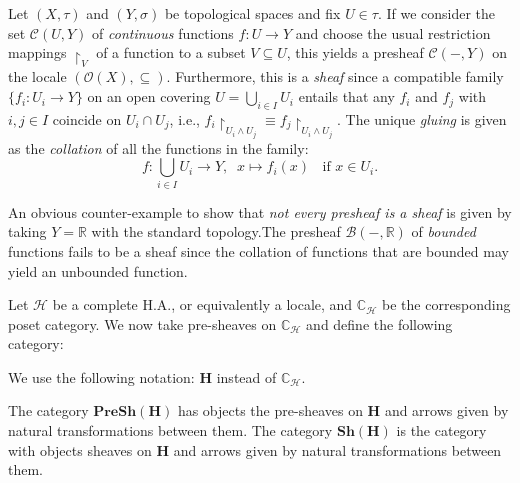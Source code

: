  \begin{ex}
 	Let $(X,\tau)$ and $(Y,\sigma)$ be topological spaces and fix $U \in \tau$. \newline
 	If we consider the set $\mathcal{C}(U,Y)$ of \emph{continuous} functions $f: U \rightarrow Y$ and choose the usual restriction mappings $\restriction_V$ of a function to a subset $V \subseteq U$, this yields a presheaf $\mathcal{C}(-,Y)$ on the locale $(\mathcal{O}(X),\subseteq)$.\newline
 	Furthermore, this is a \emph{sheaf} since a compatible family $\{f_i : U_i \rightarrow Y\}$ on an open covering $U= \bigcup_{i \in I} U_i$ entails that any $f_i$ and $f_j$ with $i,j \in I$ coincide on $U_i \cap U_j$, i.e., $f_i \restriction_{U_i \land U_j} \equiv f_j \restriction_{U_i \land U_j}$. \newline
 	The unique \emph{gluing} is given as the \emph{collation} of all the functions in the family:
 	\begin{equation*}
 		f: \bigcup_{i \in I} U_i \rightarrow Y, \;\; x \mapsto f_i(x) \;\;\text{ if }x \in U_i.
 	\end{equation*}   
 \end{ex}
 
 \begin{remark}
 	An obvious counter-example to show that \emph{not every presheaf is a sheaf} is given by taking $Y= \mathbb{R}$ with the standard topology.\newline The presheaf $\mathcal{B}(-,\mathbb{R})$ of \emph{bounded} functions fails to be a sheaf since the collation of functions that are bounded may yield an unbounded function. 
 \end{remark}
 
 
 Let $\mathcal{H}$ be a complete H.A., or equivalently a locale, and $\mathbb{C}_{\mathcal{H}}$ be the corresponding poset category.\newline
 We now take pre-sheaves on $\mathbb{C}_{\mathcal{H}}$ and define the following category:
 
 \begin{remark}
 	We use the following notation: $\mathbf{H}$ instead of $\mathbb{C}_{\mathcal{H}}$.
 \end{remark} 
 
 \begin{definition}
 	The category $\mathbf{PreSh}(\mathbf{H})$ has objects the pre-sheaves on $\mathbf{H}$ and arrows given by natural transformations between them. \newline
 	The category $\mathbf{Sh}(\mathbf{H})$ is the category with objects sheaves on $\mathbf{H}$ and arrows given by natural transformations between them.
 \end{definition} 
 
